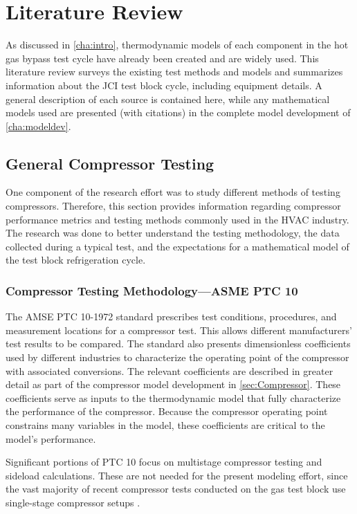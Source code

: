 \chapter{Literature Review} \label{cha:litreview}
As discussed in \cref{cha:intro}, thermodynamic models of each component
in the hot gas bypass test cycle have already been created and are widely used.
This literature review surveys the existing test methods and models 
and summarizes information about the JCI
test block cycle, including equipment details. A general description of each
source is contained here, while any mathematical models used are presented
(with citations) in the complete model development of \cref{cha:modeldev}.

\section{General Compressor Testing} \label{sec:gencomp}
One component of the research effort was 
to study different methods of testing compressors. 
Therefore, this section provides information regarding compressor performance metrics 
and testing methods commonly used in the HVAC industry. 
The research was done to better understand the testing methodology, 
the data collected during a typical test, 
and the expectations for a mathematical model of the test block refrigeration cycle.

\subsection{Compressor Testing Methodology---ASME PTC 10} \label{sec:TestMethodology}
The AMSE PTC 10-1972 standard \parencite{ptc10} prescribes test conditions, 
procedures, and measurement locations for a compressor test. 
This allows different manufacturers' test results to be compared. 
The standard also presents dimensionless coefficients used by different 
industries to characterize the operating point of the compressor
with associated conversions. 
The relevant coefficients are described in greater detail as part of the 
compressor model development in \cref{sec:Compressor}.
These coefficients serve as inputs to the thermodynamic model
that fully characterize the performance of the compressor.
Because the compressor operating point constrains
many variables in the model, these coefficients 
are critical to the model's performance.

Significant portions of PTC 10 focus on multistage compressor testing
and sideload calculations. These are not needed for the present
modeling effort, since the vast majority of recent compressor tests
conducted on the  gas test block use 
single-stage compressor setups \parencite{trevino2012}.

